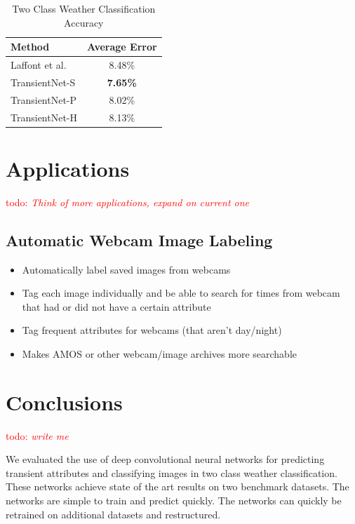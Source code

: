 \documentclass{article}
\newcommand{\todo}[1]{\textcolor{red}{todo: {\em #1}}}
\begin{document}
\begin{table}[t]
	\centering
	\begin{tabular}{ | l | c | }
		\hline
			Method & Average Error \\ \hline
			Laffont et al. \cite{Laffont14}& 8.48\% \\ \hline
			TransientNet-S & \textbf{7.65\%} \\ \hline
			TransientNet-P & 8.02\% \\ \hline
			TransientNet-H & 8.13\% \\ 
		\hline
	\end{tabular}
	\caption{Two Class Weather Classification Accuracy}
	\label{tbl:transient}
\end{table}

\section{Applications}
\todo{Think of more applications, expand on current one}
\subsection{Automatic Webcam Image Labeling}

\begin{itemize}

	\item Automatically label saved images from webcams
	\item Tag each image individually and be able to search for times from
			  webcam that had or did not have a certain attribute
	\item Tag frequent attributes for webcams (that aren't day/night)
	\item Makes AMOS or other webcam/image archives more searchable

\end{itemize}


\section{Conclusions}
\todo{write me}

We evaluated the use of deep convolutional neural networks for predicting
transient attributes and classifying images in two class weather 
classification.  These networks achieve state of the art results on two
benchmark datasets.  The networks are simple to train and predict 
quickly.  The networks can quickly be retrained on additional datasets
and restructured.




\end{document}
